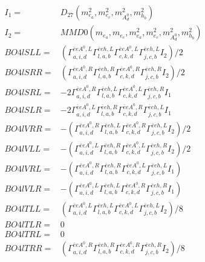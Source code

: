 \documentclass[A4,landscape]{article}
\begin{document}
\begin{align} 
I_1 = & D_{27}(m^2_{e_{{a}}}, m^2_{e_{{c}}}, m^2_{A^0_{{d}}}, m^2_{h_{{b}}}) \\ 
I_2 = & MMD0(m_{e_{{a}}}, m_{e_{{c}}}, m^2_{e_{{a}}}, m^2_{e_{{c}}}, m^2_{A^0_{{d}}}, m^2_{h_{{b}}}) \\ 
  BO4lSLL= & ( \Gamma^{\bar{e}e A^0 ,L}_{a, i, d} \Gamma^{\bar{e}e h ,L}_{l, a, b} \Gamma^{\bar{e}e A^0 ,L}_{c, k, d} \Gamma^{\bar{e}e h ,L}_{j, c, b} I_2)/2 \\ 
  BO4lSRR= & ( \Gamma^{\bar{e}e A^0 ,R}_{a, i, d} \Gamma^{\bar{e}e h ,R}_{l, a, b} \Gamma^{\bar{e}e A^0 ,R}_{c, k, d} \Gamma^{\bar{e}e h ,R}_{j, c, b} I_2)/2 \\ 
  BO4lSRL= & -2  \Gamma^{\bar{e}e A^0 ,R}_{a, i, d} \Gamma^{\bar{e}e h ,L}_{l, a, b} \Gamma^{\bar{e}e A^0 ,L}_{c, k, d} \Gamma^{\bar{e}e h ,R}_{j, c, b} I_1 \\ 
  BO4lSLR= & -2  \Gamma^{\bar{e}e A^0 ,L}_{a, i, d} \Gamma^{\bar{e}e h ,R}_{l, a, b} \Gamma^{\bar{e}e A^0 ,R}_{c, k, d} \Gamma^{\bar{e}e h ,L}_{j, c, b} I_1 \\ 
  BO4lVRR= & -( \Gamma^{\bar{e}e A^0 ,R}_{a, i, d} \Gamma^{\bar{e}e h ,L}_{l, a, b} \Gamma^{\bar{e}e A^0 ,R}_{c, k, d} \Gamma^{\bar{e}e h ,L}_{j, c, b} I_2)/2 \\ 
  BO4lVLL= & -( \Gamma^{\bar{e}e A^0 ,L}_{a, i, d} \Gamma^{\bar{e}e h ,R}_{l, a, b} \Gamma^{\bar{e}e A^0 ,L}_{c, k, d} \Gamma^{\bar{e}e h ,R}_{j, c, b} I_2)/2 \\ 
  BO4lVRL= & -( \Gamma^{\bar{e}e A^0 ,R}_{a, i, d} \Gamma^{\bar{e}e h ,R}_{l, a, b} \Gamma^{\bar{e}e A^0 ,L}_{c, k, d} \Gamma^{\bar{e}e h ,L}_{j, c, b} I_1) \\ 
  BO4lVLR= & -( \Gamma^{\bar{e}e A^0 ,L}_{a, i, d} \Gamma^{\bar{e}e h ,L}_{l, a, b} \Gamma^{\bar{e}e A^0 ,R}_{c, k, d} \Gamma^{\bar{e}e h ,R}_{j, c, b} I_1) \\ 
  BO4lTLL= & ( \Gamma^{\bar{e}e A^0 ,L}_{a, i, d} \Gamma^{\bar{e}e h ,L}_{l, a, b} \Gamma^{\bar{e}e A^0 ,L}_{c, k, d} \Gamma^{\bar{e}e h ,L}_{j, c, b} I_2)/8 \\ 
  BO4lTLR= & 0 \\ 
  BO4lTRL= & 0 \\ 
  BO4lTRR= & ( \Gamma^{\bar{e}e A^0 ,R}_{a, i, d} \Gamma^{\bar{e}e h ,R}_{l, a, b} \Gamma^{\bar{e}e A^0 ,R}_{c, k, d} \Gamma^{\bar{e}e h ,R}_{j, c, b} I_2)/8 \\ 
\end{align} 
\end{document}
